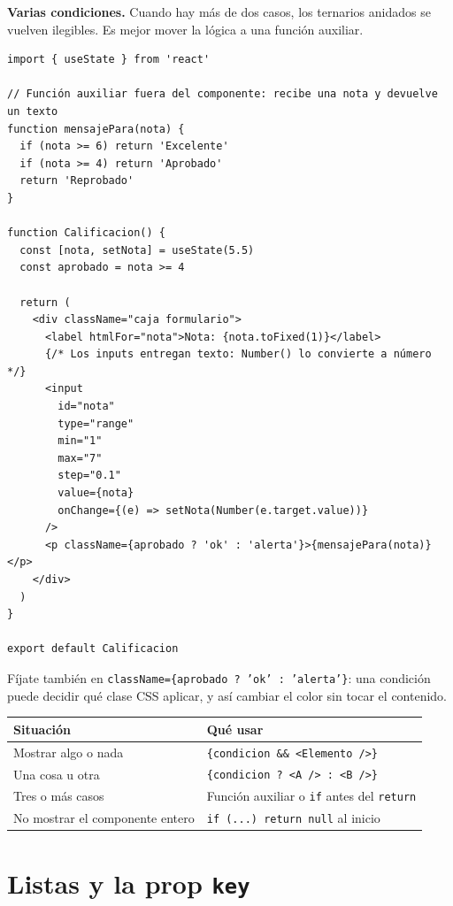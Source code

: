 \documentclass[11pt,a4paper]{article}
\newcommand{\cmd}[1]{\texttt{\color{reactdark}#1}}
\begin{document}
\textbf{Varias condiciones.} Cuando hay más de dos casos, los ternarios anidados se vuelven ilegibles. Es mejor mover la lógica a una función auxiliar.

\begin{lstlisting}[language=JSX,title={\small\ttfamily src/components/condicional/Calificacion.jsx}]
import { useState } from 'react'

// Función auxiliar fuera del componente: recibe una nota y devuelve un texto
function mensajePara(nota) {
  if (nota >= 6) return 'Excelente'
  if (nota >= 4) return 'Aprobado'
  return 'Reprobado'
}

function Calificacion() {
  const [nota, setNota] = useState(5.5)
  const aprobado = nota >= 4

  return (
    <div className="caja formulario">
      <label htmlFor="nota">Nota: {nota.toFixed(1)}</label>
      {/* Los inputs entregan texto: Number() lo convierte a número */}
      <input
        id="nota"
        type="range"
        min="1"
        max="7"
        step="0.1"
        value={nota}
        onChange={(e) => setNota(Number(e.target.value))}
      />
      <p className={aprobado ? 'ok' : 'alerta'}>{mensajePara(nota)}</p>
    </div>
  )
}

export default Calificacion
\end{lstlisting}

Fíjate también en \cmd{className=\{aprobado ? 'ok' : 'alerta'\}}: una condición puede decidir qué clase CSS aplicar, y así cambiar el color sin tocar el contenido.

\begin{center}
\small
\begin{tabular}{p{4.6cm} p{8cm}}
\toprule
\textbf{Situación} & \textbf{Qué usar} \\
\midrule
Mostrar algo o nada & \cmd{\{condicion \&\& <Elemento />\}} \\
Una cosa u otra & \cmd{\{condicion ? <A /> : <B />\}} \\
Tres o más casos & Función auxiliar o \cmd{if} antes del \cmd{return} \\
No mostrar el componente entero & \cmd{if (...) return null} al inicio \\
\bottomrule
\end{tabular}
\end{center}

\section{Listas y la prop \texttt{key}}
\end{document}

